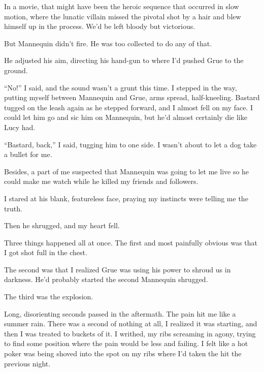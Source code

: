 In a movie, that might have been the heroic sequence that occurred in slow motion, where the lunatic villain missed the pivotal shot by a hair and blew himself up in the process.  We'd be left bloody but victorious.



But Mannequin didn't fire.  He was too collected to do any of that.



He adjusted his aim, directing his hand-gun to where I'd pushed Grue to the ground.



``No!'' I said, and the sound wasn't a grunt this time.  I stepped in the way, putting myself between Mannequin and Grue, arms spread, half-kneeling.  Bastard tugged on the leash again as he stepped forward, and I almost fell on my face.  I could let him go and sic him on Mannequin, but he'd almost certainly die like Lucy had.



``Bastard, back,'' I said, tugging him to one side.  I wasn't about to let a dog take a bullet for me.



Besides, a part of me suspected that Mannequin was going to let me live so he could make me watch while he killed my friends and followers.



I stared at his blank, featureless face, praying my instincts were telling me the truth.



Then he shrugged, and my heart fell.



Three things happened all at once.  The first and most painfully obvious was that I got shot full in the chest.



The second was that I realized Grue was using his power to shroud us in darkness.  He'd probably started the second Mannequin shrugged.



The third was the explosion.



Long, disorienting seconds passed in the aftermath.  The pain hit me like a summer rain.  There was a second of nothing at all, I realized it was starting, and then I was treated to buckets of it.  I writhed, my ribs screaming in agony, trying to find some position where the pain would be less and failing.  I felt like a hot poker was being shoved into the spot on my ribs where I'd taken the hit the previous night.



